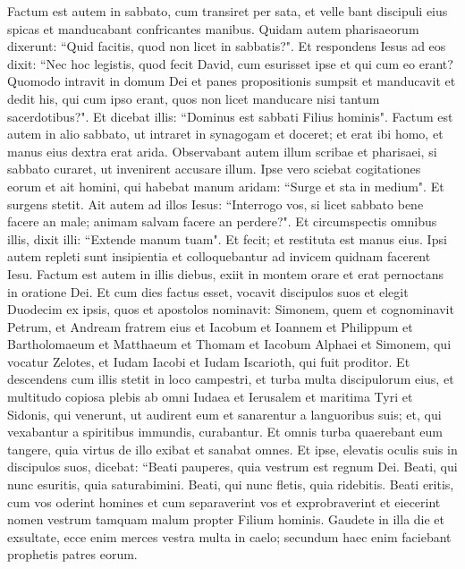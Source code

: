 \begin{biblechapter}  
\verse Factum est autem in sabbato, cum transiret per sata, et velle bant discipuli eius spicas et manducabant confricantes manibus. 
\verse Quidam autem pharisaeorum dixerunt: “Quid facitis, quod non licet in sabbatis?". 
\verse Et respondens Iesus ad eos dixit: “Nec hoc legistis, quod fecit David, cum esurisset ipse et qui cum eo erant? 
\verse Quomodo intravit in domum Dei et panes propositionis sumpsit et manducavit et dedit his, qui cum ipso erant, quos non licet manducare nisi tantum sacerdotibus?". 
\verse Et dicebat illis: “Dominus est sabbati Filius hominis". 
\verse Factum est autem in alio sabbato, ut intraret in synagogam et doceret; et erat ibi homo, et manus eius dextra erat arida. 
\verse Observabant autem illum scribae et pharisaei, si sabbato curaret, ut invenirent accusare illum. 
\verse Ipse vero sciebat cogitationes eorum et ait homini, qui habebat manum aridam: “Surge et sta in medium". Et surgens stetit. 
\verse Ait autem ad illos Iesus: “Interrogo vos, si licet sabbato bene facere an male; animam salvam facere an perdere?".  
\verse Et circumspectis omnibus illis, dixit illi: “Extende manum tuam". Et fecit; et restituta est manus eius. 
\verse Ipsi autem repleti sunt insipientia et colloquebantur ad invicem quidnam facerent Iesu. 
\verse Factum est autem in illis diebus, exiit in montem orare et erat pernoctans in oratione Dei. 
\verse Et cum dies factus esset, vocavit discipulos suos et elegit Duodecim ex ipsis, quos et apostolos nominavit: 
\verse Simonem, quem et cognominavit Petrum, et Andream fratrem eius et Iacobum et Ioannem et Philippum et Bartholomaeum 
\verse et Matthaeum et Thomam et Iacobum Alphaei et Simonem, qui vocatur Zelotes, 
\verse et Iudam Iacobi et Iudam Iscarioth, qui fuit proditor. 
\verse Et descendens cum illis stetit in loco campestri, et turba multa discipulorum eius, et multitudo copiosa plebis ab omni Iudaea et Ierusalem et maritima Tyri et Sidonis, 
\verse qui venerunt, ut audirent eum et sanarentur a languoribus suis; et, qui vexabantur a spiritibus immundis, curabantur. 
\verse Et omnis turba quaerebant eum tangere, quia virtus de illo exibat et sanabat omnes. 
\verse Et ipse, elevatis oculis suis in discipulos suos, dicebat: “Beati pauperes, quia vestrum est regnum Dei. 
\verse Beati, qui nunc esuritis, quia saturabimini. Beati, qui nunc fletis, quia ridebitis. 
\verse Beati eritis, cum vos oderint homines et cum separaverint vos et exprobraverint et eiecerint nomen vestrum tamquam malum propter Filium hominis.  
\verse Gaudete in illa die et exsultate, ecce enim merces vestra multa in caelo; secundum haec enim faciebant prophetis patres eorum. 

\end{biblechapter}
